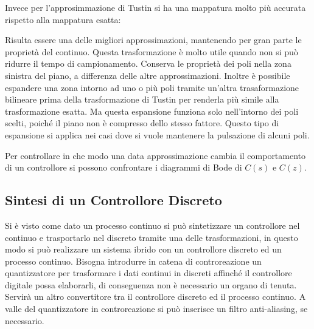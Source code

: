 \documentclass{article}
\numberwithin{equation}{subsection}
\begin{document}
Invece per l'approsimmazione di Tustin si ha una mappatura molto più accurata rispetto alla mappatura esatta:
\begin{center}
\end{center}
Risulta essere una delle migliori approssimazioni, mantenendo per gran parte le proprietà del continuo. Questa trasformazione è molto utile quando non si può ridurre il 
tempo di campionamento. Conserva le proprietà dei poli nella zona sinistra del piano, a differenza delle altre approssimazioni. Inoltre è possibile espandere una zona 
intorno ad uno o più poli tramite un'altra trasaformazione bilineare prima della trasformazione di Tustin per renderla più simile alla trasformazione esatta. Ma questa 
espansione funziona solo nell'intorno dei poli scelti, poiché il piano non è compresso dello stesso fattore. Questo tipo di espansione si applica nei casi dove si 
vuole mantenere la pulsazione di alcuni poli. 

Per controllare in che modo una data approssimazione cambia il comportamento di un controllore si possono confrontare i diagrammi di Bode di $C(s)$ e $C(z)$. 

\subsection{Sintesi di un Controllore Discreto}

Si è visto come dato un processo continuo si può sintetizzare un controllore nel continuo e 
trasportarlo nel discreto tramite una delle trasformazioni, in questo modo 
si può realizzare un sistema ibrido con un controllore discreto ed un processo continuo. Bisogna introdurre in catena di controreazione un quantizzatore per trasformare i 
dati continui in discreti affinché il controllore digitale possa elaborarli, di conseguenza non è necessario un organo di tenuta. Servirà un altro convertitore tra il 
controllore discreto ed il processo continuo. A valle del quantizzatore in controreazione si può inserisce un filtro anti-aliasing, se necessario.
\end{document}
